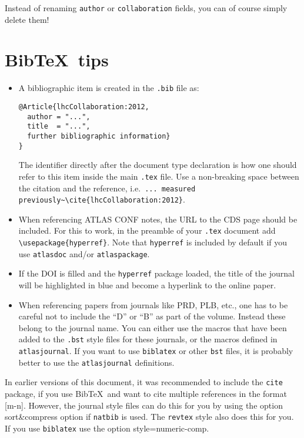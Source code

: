\documentclass[UKenglish]{latex/atlasdoc}
\newcommand*{\BibTeX}{Bib\TeX}
\newcommand{\File}[1]{\texttt{#1}\xspace}
\newcommand{\Option}[1]{\textsf{#1}\xspace}
\newcommand{\Package}[1]{\texttt{#1}\xspace}
\begin{document}
Instead of renaming \texttt{author} or \texttt{collaboration} fields, you can of course simply delete them!


\section{\BibTeX\ tips}

\begin{itemize}
\item A bibliographic item is created in the \File{.bib} file as:
\begin{verbatim}
@Article{lhcCollaboration:2012,
  author = "...",
  title  = "...",
  further bibliographic information}
}
\end{verbatim}
  The identifier directly after the document type declaration is how one should refer to this item inside the main \File{.tex} file.
  Use a non-breaking space between the citation and the reference, i.e.\
  \verb|... measured previously~\cite{lhcCollaboration:2012}|.
\item When referencing ATLAS CONF notes, the URL to the CDS page should be included.
  For this to work, in the preamble of your \File{.tex} document add
  \texttt{\textbackslash usepackage\{hyperref\}}.
  Note that \Package{hyperref} is included by default if you use \Package{atlasdoc} and/or \Package{atlaspackage}.
\item If the DOI is filled and the \texttt{hyperref} package loaded, 
  the title of the journal will be highlighted in blue and become a hyperlink to the online paper.
\item When referencing papers from journals like PRD, PLB, etc.,
  one has to be careful not to include the \enquote{D} or \enquote{B} as part of the volume.
  Instead these belong to the journal name. 
  You can either use the macros that have been added to the \File{.bst} style files for these journals, or
  the macros defined in \Package{atlasjournal}.
  If you want to use \Package{biblatex} or other \File{bst} files, it is probably better to use the
  \Package{atlasjournal} definitions.
\end{itemize}

In earlier versions of this document, it was recommended to include the \Package{cite} package, 
if you use \BibTeX\ and want to cite multiple references in the format [m-n].
However, the journal style files can do this for you by using the option \Option{sort\&compress} option if \Package{natbib} is used.
The \texttt{revtex} style also does this for you.
If you use \texttt{biblatex} use the option \Option{style=numeric-comp}.
\end{document}
